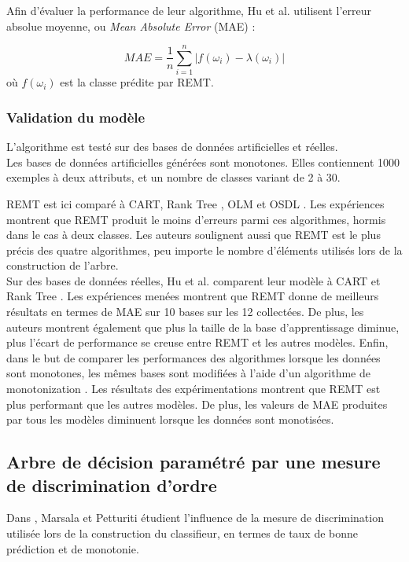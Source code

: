 \documentclass[a4paper]{article}
\begin{document}
Afin d'évaluer la performance de leur algorithme, Hu et al. utilisent l'erreur
absolue moyenne, ou \emph{Mean Absolute Error} (MAE) : 

\begin{equation}
    MAE = \frac{1}{n}
\sum_{i=1}^{n}|f(\omega_i) - \lambda(\omega_i)| 
\label{eq:MAE}
\end{equation}
où $f(\omega_i)$ est la
classe prédite par REMT. \\

\subsubsection{Validation du modèle}

L'algorithme est testé sur des bases de données artificielles et réelles. \\

Les bases de données artificielles générées sont monotones. Elles contiennent
1000 exemples à deux attributs, et un nombre de classes variant de 2 à 30.

REMT est ici comparé à CART, Rank Tree \cite{xia-ranking}, OLM
\cite{ben-learning} et OSDL \cite{cao-supervised}. Les expériences montrent que
REMT produit le moins d'erreurs parmi ces algorithmes, hormis dans le cas à deux
classes.  Les auteurs soulignent aussi que REMT est le plus précis des quatre
algorithmes, peu importe le nombre d'éléments utilisés lors de la construction
de l'arbre. \\

Sur des bases de données réelles, Hu et al. \cite{hu-rank} comparent leur modèle
à CART et Rank Tree \cite{xia-ranking}. Les expériences menées montrent que REMT
donne de meilleurs résultats en termes de MAE sur 10 bases sur les 12
collectées. De plus, les auteurs montrent également que plus la taille de la
base d'apprentissage diminue, plus l'écart de performance se creuse entre REMT
et les autres modèles.  \noindent Enfin, dans le but de comparer les
performances des algorithmes lorsque les données sont monotones, les mêmes bases
sont modifiées à l'aide d'un algorithme de monotonization \cite{kotlowski-rule}.
Les résultats des expérimentations montrent que REMT est plus performant que les
autres modèles. De plus, les valeurs de MAE produites par tous les modèles
diminuent lorsque les données sont monotisées.

\subsection{Arbre de décision paramétré par une mesure de discrimination
d'ordre} 
Dans \cite{marsala-rank}, Marsala et Petturiti étudient l'influence de
la mesure de discrimination utilisée lors de la construction du classifieur, en
termes de taux de bonne prédiction et de monotonie. 
\end{document}
